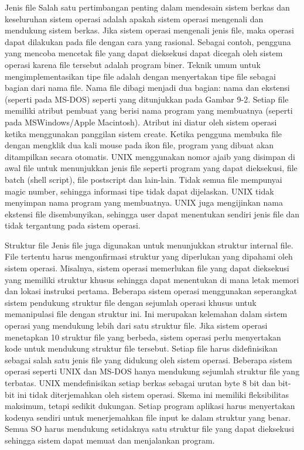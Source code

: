 \documentclass[12pt]{article}
\begin{document}
\begin{itemize}
      Jenis file 
      Salah satu pertimbangan penting dalam mendesain sistem berkas dan keseluruhan sistem operasi adalah apakah sistem operasi mengenali dan mendukung sistem berkas. Jika sistem operasi mengenali jenis file, maka operasi dapat dilakukan pada file dengan cara yang rasional. Sebagai contoh, pengguna yang mencoba mencetak file yang dapat dieksekusi dapat dicegah oleh sistem operasi karena file tersebut adalah program biner. Teknik umum untuk mengimplementasikan tipe file adalah dengan menyertakan tipe file sebagai bagian dari nama file. Nama file dibagi menjadi dua bagian: nama dan ekstensi (seperti pada MS-DOS) seperti yang ditunjukkan pada Gambar 9-2. Setiap file memiliki atribut pembuat yang berisi nama program yang membuatnya (seperti pada MSWindows/Apple Macintosh). Atribut ini diatur oleh sistem operasi ketika menggunakan panggilan sistem create. Ketika pengguna membuka file dengan mengklik dua kali mouse pada ikon file, program yang dibuat akan ditampilkan secara otomatis. UNIX menggunakan nomor ajaib yang disimpan di awal file untuk menunjukkan jenis file seperti program yang dapat dieksekusi, file batch (shell script), file postscript dan lain-lain. Tidak semua file mempunyai magic number, sehingga informasi tipe tidak dapat dijelaskan. UNIX tidak menyimpan nama program yang membuatnya. UNIX juga mengijinkan nama ekstensi file disembunyikan, sehingga user dapat menentukan sendiri jenis file dan tidak tergantung pada sistem operasi. 

      Struktur file 
      Jenis file juga digunakan untuk menunjukkan struktur internal file. File tertentu harus mengonfirmasi struktur yang diperlukan yang dipahami oleh sistem operasi. Misalnya, sistem operasi memerlukan file yang dapat dieksekusi yang memiliki struktur khusus sehingga dapat menentukan di mana letak memori dan lokasi instruksi pertama. Beberapa sistem operasi menggunakan seperangkat sistem pendukung struktur file dengan sejumlah operasi khusus untuk memanipulasi file dengan struktur ini. Ini merupakan kelemahan dalam sistem operasi yang mendukung lebih dari satu struktur file. Jika sistem operasi menetapkan 10 struktur file yang berbeda, sistem operasi perlu menyertakan kode untuk mendukung struktur file tersebut. Setiap file harus didefinisikan sebagai salah satu jenis file yang didukung oleh sistem operasi. Beberapa sistem operasi seperti UNIX dan MS-DOS hanya mendukung sejumlah struktur file yang terbatas. UNIX mendefinisikan setiap berkas sebagai urutan byte 8 bit dan bit-bit ini tidak diterjemahkan oleh sistem operasi. Skema ini memiliki fleksibilitas maksimum, tetapi sedikit dukungan. Setiap program aplikasi harus menyertakan kodenya sendiri untuk menerjemahkan file input ke dalam struktur yang benar. Semua SO harus mendukung setidaknya satu struktur file yang dapat dieksekusi sehingga sistem dapat memuat dan menjalankan program. 


\end{itemize}
\end{document}

